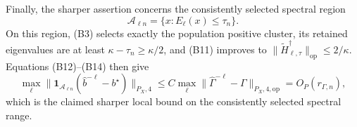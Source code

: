 Finally, the sharper assertion concerns the consistently selected spectral region
\[
 \mathcal A_{\ell n}=\{x:E_\ell(x)\le\tau_n\}.
 \tag{B17}
\]
On this region, (B3) selects exactly the population positive cluster, its retained eigenvalues are at least \(\kappa-\tau_n\ge\kappa/2\), and (B11) improves to \(\|\widetilde H_{\ell,\tau}^\dagger\|_{\mathrm{op}}\le2/\kappa\).  Equations (B12)--(B14) then give
\[
 \max_\ell
 \|\mathbf 1_{\mathcal A_{\ell n}}(\widehat b^{-\ell}-b^\star)\|_{P_X,4}
 \le C\max_\ell\|\widehat\Gamma^{-\ell}-\Gamma\|_{P_X,4,\mathrm{op}}
 =O_P(r_{\Gamma,n}),
 \tag{B18}
\]
which is the claimed sharper local bound on the consistently selected spectral range.
